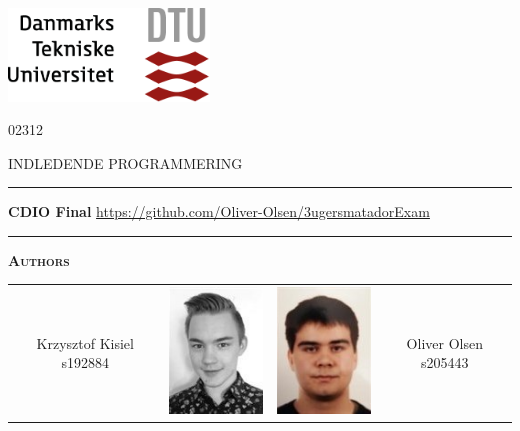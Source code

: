 
\begin{titlepage}
\begin{center}
\includegraphics[width=0.4\textwidth]{root/dtu.png}
\vspace{1cm}

02312

INDLEDENDE PROGRAMMERING

\vspace{.5cm}

\hrule
\vspace{.5cm}
{ \huge \bfseries CDIO Final} %
\vspace{.3cm}\linebreak
\url{https://github.com/Oliver-Olsen/3ugersmatadorExam}
\vspace{.3cm}
\hrule
\vspace{.5cm}

\textsc{\textbf{Authors}}\\
\vspace{.5cm}


\begin{tabular}[!c]{cccc}
  Krzysztof Kisiel s192884 & \includegraphics[width=2.75cm]{root/krzysztof.png} &   \includegraphics[width=2.75cm]{root/oliver.png} & Oliver Olsen s205443  \\


\end{tabular}
\end{center}
\end{titlepage}

